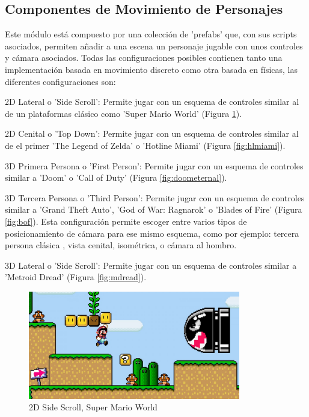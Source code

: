 \subsection{Componentes de Movimiento de Personajes}
Este módulo está compuesto por una colección de 'prefabs' que, con sus scripts asociados, permiten añadir a una escena un personaje jugable con unos controles y cámara asociados.
Todas las configuraciones posibles contienen tanto una implementación basada en movimiento discreto como otra basada en físicas, las diferentes configuraciones son: 
\begin{compactitem}
  \item 2D Lateral o 'Side Scroll': Permite jugar con un esquema de controles similar al de un plataformas clásico como 'Super Mario World' (Figura \ref{fig:smbw}).
  \item 2D Cenital o 'Top Down': Permite jugar con un esquema de controles similar al de el primer 'The Legend of Zelda' o 'Hotline Miami' (Figura \ref{fig:hlmiami}).
  \item 3D Primera Persona o 'First Person': Permite jugar con un esquema de controles similar a 'Doom' o 'Call of Duty' (Figura \ref{fig:doometernal}).
  \item 3D Tercera Persona o 'Third Person': Permite jugar con un esquema de controles similar a 'Grand Theft Auto', 'God of War: Ragnarok' o 'Blades of Fire' (Figura \ref{fig:bof}). Esta configuración permite escoger entre varios 
   tipos de posicionamiento de cámara para ese mismo esquema, como por ejemplo: tercera persona clásica , vista cenital, isométrica, o cámara al hombro. 
  \item 3D Lateral o 'Side Scroll': Permite jugar con un esquema de controles similar a 'Metroid Dread' (Figura \ref{fig:mdread}).
\end{compactitem}
\raggedbottom
\begin{figure}[H]
  \centering
    \includegraphics[width=350px,clip=true]{super_mario_world.jpg}
  \caption{2D Side Scroll, Super Mario World}
  \label{fig:smbw}
\end{figure}

